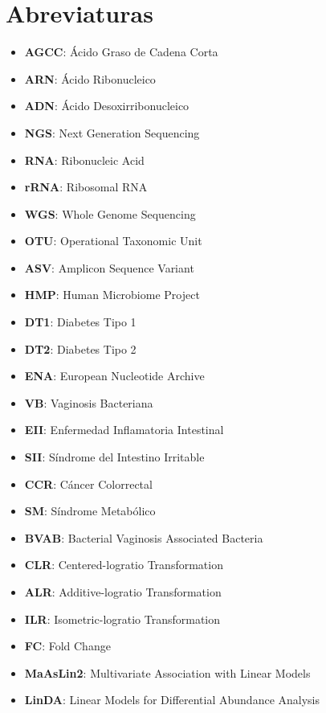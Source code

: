 
\chapter*{\textsf{\textbf{Abreviaturas}}}


\begin{itemize}
\setlength{\itemsep}{0pt}
\setlength{\parskip}{0pt}
\item \textbf{AGCC}: Ácido Graso de Cadena Corta
\item \textbf{ARN}: Ácido Ribonucleico
\item \textbf{ADN}: Ácido Desoxirribonucleico
\item \textbf{NGS}: Next Generation Sequencing
\item \textbf{RNA}: Ribonucleic Acid
\item \textbf{rRNA}: Ribosomal RNA
\item \textbf{WGS}: Whole Genome Sequencing
\item \textbf{OTU}: Operational Taxonomic Unit
\item \textbf{ASV}: Amplicon Sequence Variant
\item \textbf{HMP}: Human Microbiome Project
\item \textbf{DT1}: Diabetes Tipo 1
\item \textbf{DT2}: Diabetes Tipo 2
\item \textbf{ENA}: European Nucleotide Archive
\item \textbf{VB}: Vaginosis Bacteriana
\item \textbf{EII}: Enfermedad Inflamatoria Intestinal 
\item \textbf{SII}: Síndrome del Intestino Irritable
\item \textbf{CCR}: Cáncer Colorrectal
\item \textbf{SM}: Síndrome Metabólico
\item \textbf{BVAB}: Bacterial Vaginosis Associated Bacteria
\item \textbf{CLR}: Centered-logratio Transformation
\item \textbf{ALR}: Additive-logratio Transformation
\item \textbf{ILR}: Isometric-logratio Transformation
\item \textbf{FC}: Fold Change
\item \textbf{MaAsLin2}: Multivariate Association with Linear Models
\item \textbf{LinDA}: Linear Models for Differential Abundance Analysis

\end{itemize}
